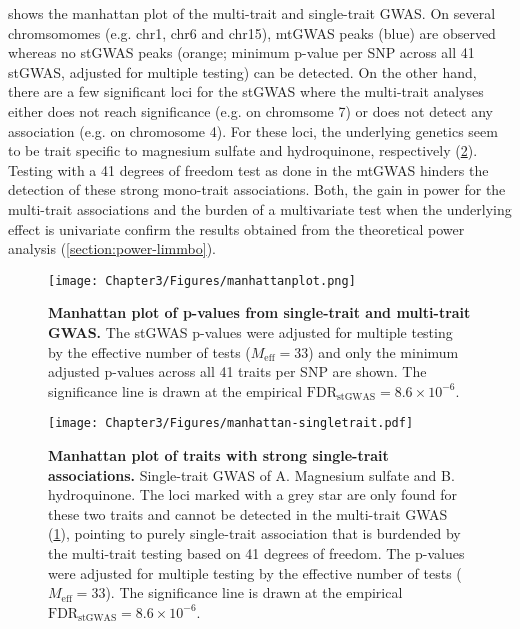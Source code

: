  shows the manhattan plot of the multi-trait and single-trait GWAS. On several chromsomomes (e.g. chr1, chr6 and chr15), mtGWAS peaks (blue) are observed whereas no stGWAS peaks (orange; minimum p-value per SNP across all \num{41} stGWAS, adjusted for multiple testing) can be detected. On the other hand, there are a few significant loci for the stGWAS where the multi-trait analyses either does not reach significance (e.g. on chromsome \num{7}) or does not detect any association (e.g. on chromosome \num{4}). For these loci, the underlying genetics seem to be trait specific to magnesium sulfate and hydroquinone, respectively (\cref{fig:stGWAS-yeast}). Testing with a \num{41} degrees of freedom test as done in the mtGWAS hinders the detection of these strong mono-trait associations. Both, the gain in power for the multi-trait associations and the burden of a multivariate test when the underlying effect is univariate confirm the results obtained from the theoretical power analysis (\cref{section:power-limmbo}). 

\begin{figure}[hbtp]
	\centering
	\texttt{[image: Chapter3/Figures/manhattanplot.png]}
	\caption[\textbf{Manhattan plot of p-values from single-trait and multi-trait GWAS.}]{\textbf{Manhattan plot of p-values from single-trait and multi-trait GWAS.} The stGWAS p-values were adjusted for multiple testing by the effective number of tests (\(M_\text{eff} = 33\)) and only the minimum adjusted p-values across all \num{41} traits per SNP are shown. The significance line is drawn at the empirical \(\text{FDR}_{\text{stGWAS}} =8.6 \times 10^{-6}\).}
 	\label{fig:GWAS-yeast}
\end{figure}

\begin{figure}[hbtp]
	\centering
	\texttt{[image: Chapter3/Figures/manhattan-singletrait.pdf]}
	\caption[\textbf{Manhattan plot of traits with strong single-trait associations.}]{\textbf{Manhattan plot of traits with strong single-trait associations.} Single-trait GWAS of A. Magnesium sulfate and B. hydroquinone. The loci marked with a grey star are only found for these two traits and cannot be detected in the multi-trait GWAS (\cref{fig:GWAS-yeast}), pointing to purely single-trait association that is burdended by the multi-trait testing based on \num{41} degrees of freedom. The  p-values were adjusted for multiple testing by the effective number of tests (\(M_\text{eff} = 33\)). The significance line is drawn at the empirical \(\text{FDR}_{\text{stGWAS}} =8.6 \times 10^{-6}\).}
 	\label{fig:stGWAS-yeast}
\end{figure}

